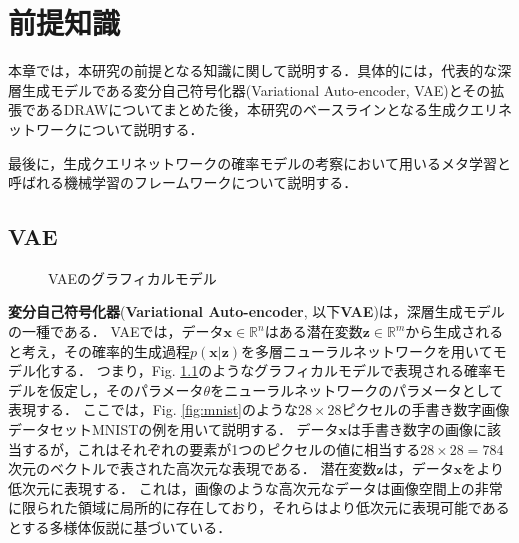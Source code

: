 \chapter{前提知識}
\label{chap:prerequisite}
本章では，本研究の前提となる知識に関して説明する．具体的には，代表的な深層生成モデルである変分自己符号化器(Variational Auto-encoder, VAE)とその拡張であるDRAWについてまとめた後，本研究のベースラインとなる生成クエリネットワークについて説明する．

最後に，生成クエリネットワークの確率モデルの考察において用いるメタ学習と呼ばれる機械学習のフレームワークについて説明する．

\section{VAE}
\label{section:VAE}

\begin{figure}[tbp]
\begin{center}
\caption{VAEのグラフィカルモデル}
\label{fig:gm_vae}
\end{center}
\end{figure}

{\bf 変分自己符号化器}({\bf Variational Auto-encoder}, 以下{\bf VAE})\cite{vae}は，深層生成モデルの一種である．
VAEでは，データ$\bm{x} \in \mathbb{R}^n$はある潜在変数$\bm{z} \in \mathbb{R}^m$から生成されると考え，その確率的生成過程$p(\bm{x}|\bm{z})$を多層ニューラルネットワークを用いてモデル化する．
つまり，Fig. \ref{fig:gm_vae}のようなグラフィカルモデルで表現される確率モデルを仮定し，そのパラメータ$\theta$をニューラルネットワークのパラメータとして表現する．
ここでは，Fig. \ref{fig:mnist}のような$28\times28$ピクセルの手書き数字画像データセットMNIST\cite{MNIST}の例を用いて説明する．
データ$\bm{x}$は手書き数字の画像に該当するが，これはそれぞれの要素が1つのピクセルの値に相当する$28\times28=784$次元のベクトルで表された高次元な表現である．
潜在変数$\bm{z}$は，データ$\bm{x}$をより低次元に表現する．
これは，画像のような高次元なデータは画像空間上の非常に限られた領域に局所的に存在しており，それらはより低次元に表現可能であるとする多様体仮説に基づいている．

